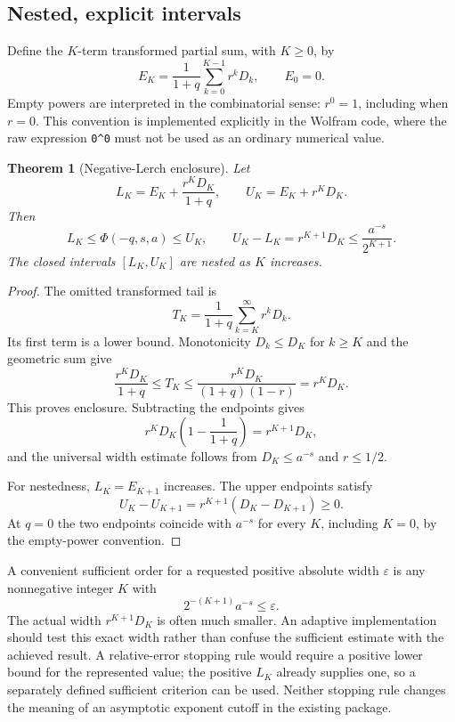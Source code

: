 \documentclass[11pt,a4paper]{article}
\newtheorem{theorem}{Theorem}[section]
\begin{document}
\subsection{Nested, explicit intervals}
Define the $K$-term transformed partial sum, with $K\ge0$, by
\[
 E_K=\frac1{1+q}\sum_{k=0}^{K-1}r^kD_k,
 \qquad E_0=0.
\]
Empty powers are interpreted in the combinatorial sense: $r^0=1$, including when $r=0$. This convention is implemented explicitly in the Wolfram code, where the raw expression \texttt{0\^{}0} must not be used as an ordinary numerical value.

\begin{theorem}[Negative-Lerch enclosure]
Let
\begin{equation}
 L_K=E_K+\frac{r^KD_K}{1+q},\qquad
 U_K=E_K+r^KD_K.
\label{eq:bounds}
\end{equation}
Then
\begin{equation}
 L_K\le\Phi(-q,s,a)\le U_K,
 \qquad
 U_K-L_K=r^{K+1}D_K\le\frac{a^{-s}}{2^{K+1}}.
\label{eq:width}
\end{equation}
The closed intervals $[L_K,U_K]$ are nested as $K$ increases.
\end{theorem}
\begin{proof}
The omitted transformed tail is
\[
 T_K=\frac1{1+q}\sum_{k=K}^{\infty}r^kD_k.
\]
Its first term is a lower bound. Monotonicity $D_k\le D_K$ for $k\ge K$ and the geometric sum give
\[
 \frac{r^KD_K}{1+q}\le T_K
 \le\frac{r^KD_K}{(1+q)(1-r)}=r^KD_K.
\]
This proves enclosure. Subtracting the endpoints gives
\[
 r^KD_K\left(1-\frac1{1+q}\right)=r^{K+1}D_K,
\]
and the universal width estimate follows from $D_K\le a^{-s}$ and $r\le1/2$.

For nestedness, $L_K=E_{K+1}$ increases. The upper endpoints satisfy
\[
 U_K-U_{K+1}=r^{K+1}(D_K-D_{K+1})\ge0.
\]
At $q=0$ the two endpoints coincide with $a^{-s}$ for every $K$, including $K=0$, by the empty-power convention.
\end{proof}

A convenient sufficient order for a requested positive absolute width $\varepsilon$ is any nonnegative integer $K$ with
\[
 2^{-(K+1)}a^{-s}\le\varepsilon.
\]
The actual width $r^{K+1}D_K$ is often much smaller. An adaptive implementation should test this exact width rather than confuse the sufficient estimate with the achieved result. A relative-error stopping rule would require a positive lower bound for the represented value; the positive $L_K$ already supplies one, so a separately defined sufficient criterion can be used. Neither stopping rule changes the meaning of an asymptotic exponent cutoff in the existing package.
\end{document}
